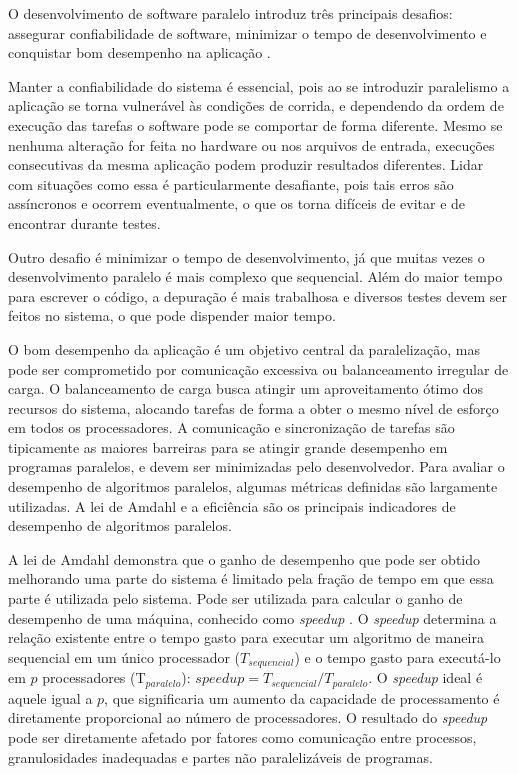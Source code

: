 O desenvolvimento de software paralelo introduz três principais desafios: assegurar confiabilidade de software, minimizar o tempo de desenvolvimento e conquistar bom desempenho na aplicação \cite{Leiserson:2008}.

Manter a confiabilidade do sistema é essencial, pois ao se introduzir paralelismo a aplicação se torna vulnerável às condições de corrida, e dependendo da ordem de execução das tarefas o software pode se comportar de forma diferente. Mesmo se nenhuma alteração for feita no hardware ou nos arquivos de entrada, execuções consecutivas da mesma aplicação podem produzir resultados diferentes. Lidar com situações como essa é particularmente desafiante, pois tais erros são assíncronos e ocorrem eventualmente, o que os torna difíceis de evitar e de encontrar durante testes.

Outro desafio é minimizar o tempo de desenvolvimento, já que muitas vezes o desenvolvimento paralelo é mais complexo que sequencial. Além do maior tempo para escrever o código, a depuração é mais trabalhosa e diversos testes devem ser feitos no sistema, o que pode dispender maior tempo.

O bom desempenho da aplicação é um objetivo central da paralelização, mas pode ser comprometido por comunicação excessiva ou balanceamento irregular de carga. 
O balanceamento de carga busca atingir um aproveitamento ótimo dos recursos do sistema, alocando tarefas de forma a obter o mesmo nível de esforço em todos os processadores. 
A comunicação e sincronização de tarefas são tipicamente as maiores barreiras para se atingir grande desempenho em programas paralelos, e devem ser minimizadas pelo desenvolvedor. Para avaliar o desempenho de algoritmos paralelos, algumas métricas definidas são largamente utilizadas. A lei de Amdahl e a eficiência são os principais indicadores de desempenho de algoritmos paralelos. 

A lei de Amdahl demonstra que o ganho de desempenho que pode ser obtido melhorando uma parte do sistema é limitado pela fração de tempo em que essa parte é utilizada pelo sistema. Pode ser utilizada para calcular o ganho de desempenho de uma máquina, conhecido como \textit{speedup} \cite{Amdahl:1967}.
O \textit{speedup} determina a relação existente entre o tempo gasto para executar um algoritmo de maneira sequencial em um único processador ($T_{sequencial}$) e o tempo gasto para executá-lo em $p$ processadores (T$_{paralelo}$): $ speedup = T_{sequencial}/T_{paralelo}$.
O \textit{speedup} ideal é aquele igual a $p$, que significaria um aumento da capacidade de processamento é diretamente proporcional ao número de processadores. O resultado do \textit{speedup}
pode ser diretamente afetado por fatores como comunicação entre processos, granulosidades inadequadas e partes não paralelizáveis de programas.
 
